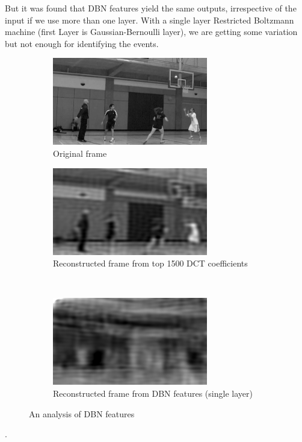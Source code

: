But it was found that DBN features yield the same outputs, irrespective of the input if we use more than one layer.  With a single layer Restricted Boltzmann machine (first Layer is Gaussian-Bernoulli layer), we are getting some variation but not enough for identifying the events.\\


\begin{figure}
        \centering
        \begin{subfigure}[b]{\textwidth}
        			\centering
                \includegraphics[scale=1]{./imgs/Original.png}
                \caption{Original frame}
                \label{fig:original}
        \end{subfigure}%
        
        \begin{subfigure}[b]{0.45\textwidth}
        		\centering
        		\includegraphics[scale=1]{./imgs/DCT.png}
        		\caption{Reconstructed frame from top 1500 DCT coefficients}
        		\label{fig:dct}
        \end{subfigure}
        ~%
        \begin{subfigure}[b]{0.45\textwidth}
        			\centering
                \includegraphics[scale=1]{./imgs/DBN.png}
                \caption{Reconstructed frame from DBN features (single layer)}
                \label{fig:dbn}
        \end{subfigure}
        \caption{ An analysis of DBN features}
        \label{fig:dct+dbn}
\end{figure}.

